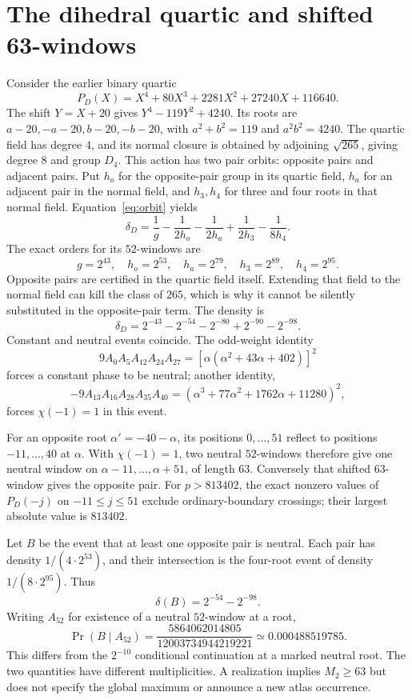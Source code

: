 \documentclass[11pt]{article}
\theoremstyle{definition}\newtheorem{definition}[theorem]{Definition}
\newcommand{\Prob}{\operatorname{Pr}}
\begin{document}
\section{The dihedral quartic and shifted 63-windows}\label{sec:dihedral}
Consider the earlier binary quartic
\[
 P_D(X)=X^4+80X^3+2281X^2+27240X+116640.
\]
The shift $Y=X+20$ gives $Y^4-119Y^2+4240$.
Its roots are $a-20,-a-20,b-20,-b-20$, with
$a^2+b^2=119$ and $a^2b^2=4240$. The quartic field has degree
$4$, and its normal closure is obtained by adjoining $\sqrt{265}$,
giving degree $8$ and group $D_4$. This action has two pair orbits:
opposite pairs and adjacent pairs. Put $h_o$ for the opposite-pair
group in its quartic field, $h_a$ for an adjacent pair in the normal
field, and $h_3,h_4$ for three and four roots in that normal field.
Equation~\eqref{eq:orbit} yields
\begin{equation}\label{eq:D4}
 \delta_D=\frac1g-\frac1{2h_o}-\frac1{2h_a}
                  +\frac1{2h_3}-\frac1{8h_4}.
\end{equation}
The exact orders for its $52$-windows are
\[
 g=2^{43},\quad h_o=2^{53},\quad h_a=2^{79},
 \quad h_3=2^{89},\quad h_4=2^{95}.
\]
Opposite pairs are certified in the quartic field itself. Extending
that field to the normal field can kill the class of $265$, which
is why it cannot be silently substituted in the opposite-pair term.
The density is
\[
 \delta_D=2^{-43}-2^{-54}-2^{-80}+2^{-90}-2^{-98}.
\]
Constant and neutral events coincide. The odd-weight identity
\[
 9A_0A_5A_{12}A_{24}A_{27}
       =[\alpha(\alpha^2+43\alpha+402)]^2
\]
forces a constant phase to be neutral; another identity,
\[
 -9A_{13}A_{16}A_{28}A_{35}A_{40}
       =(\alpha^3+77\alpha^2+1762\alpha+11280)^2,
\]
forces $\chi(-1)=1$ in this event.

For an opposite root $\alpha'=-40-\alpha$, its positions
$0,\ldots,51$ reflect to positions $-11,\ldots,40$ at $\alpha$.
With $\chi(-1)=1$, two neutral $52$-windows therefore give one
neutral window on $\alpha-11,\ldots,\alpha+51$, of length $63$.
Conversely that shifted $63$-window gives the opposite pair.
For $p>813402$, the exact nonzero values of $P_D(-j)$ on
$-11\le j\le51$ exclude ordinary-boundary crossings; their largest
absolute value is $813402$.

Let $B$ be the event that at least one opposite pair is neutral.
Each pair has density $1/(4\cdot2^{53})$, and their intersection
is the four-root event of density $1/(8\cdot2^{95})$. Thus
\[
 \delta(B)=2^{-54}-2^{-98}.
\]
Writing $A_{52}$ for existence of a neutral $52$-window at a root,
\[
 \Prob(B\mid A_{52})=\frac{5864062014805}{12003734944219221}
 \simeq0.000488519785.
\]
This differs from the $2^{-10}$ conditional continuation at a
marked neutral root. The two quantities have different
multiplicities. A realization implies $M_2\ge63$ but does not
specify the global maximum or announce a new atlas occurrence.
\end{document}
